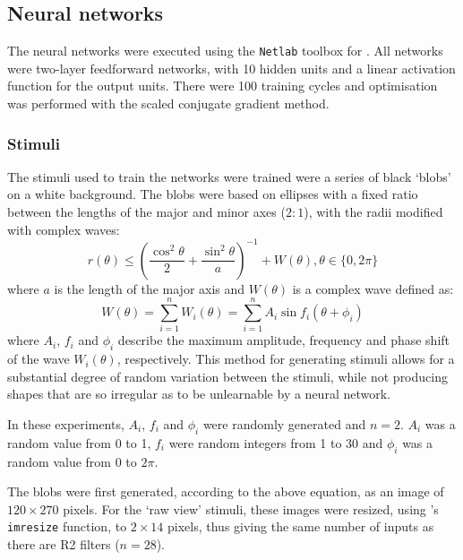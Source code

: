 \subsection*{Neural networks}
\label{sec:methods:neuralnetworks}
The neural networks were executed using the \texttt{Netlab} toolbox for \Matlab.
All networks were two-layer feedforward networks, with 10 hidden units and a linear activation function for the output units.
There were 100 training cycles and optimisation was performed with the scaled conjugate gradient method.

\subsubsection*{Stimuli}
\label{sec:methods:stimuli}
The stimuli used to train the networks were trained were a series of black `blobs' on a white background.
The blobs were based on ellipses with a fixed ratio between the lengths of the major and minor axes ($2:1$), with the radii modified with complex waves:
$$
r(\theta) \le \left(\frac{\cos^2 \theta}{2} + \frac{\sin^2 \theta}{a} \right)^{-1} + W(\theta), \theta \in \{0, 2\pi\}
$$
where $a$ is the length of the major axis and $W(\theta)$ is a complex wave defined as:
$$
W(\theta) = \sum_{i=1}^n W_i(\theta) = \sum_{i=1}^n A_i \sin f_i (\theta+\phi_i) 
$$
where $A_i$, $f_i$ and $\phi_i$ describe the maximum amplitude, frequency and phase shift of the wave $W_i(\theta)$, respectively.
This method for generating stimuli allows for a substantial degree of random variation between the stimuli, while not producing shapes that are so irregular as to be unlearnable by a neural network.

In these experiments, $A_i$, $f_i$ and $\phi_i$ were randomly generated and $n=2$.
$A_i$ was a random value from 0 to 1, $f_i$ were random integers from 1 to 30 and $\phi_i$ was a random value from 0 to $2\pi$.
\begin{comment}
nvar = 1000;
nwave = 2;
maxfreq = 30;
maxamp = 1;
\end{comment}

The blobs were first generated, according to the above equation, as an image of $120\times 270$ pixels.
For the `raw view' stimuli, these images were resized, using \Matlab's \texttt{imresize} function, to $2\times 14$ pixels, thus giving the same number of inputs as there are R2 filters ($n=28$).

